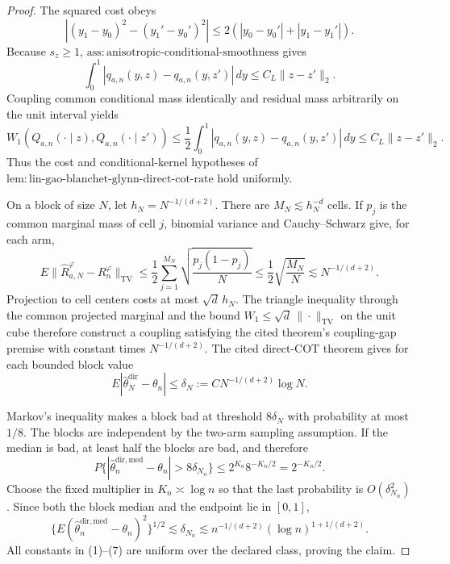 \documentclass{article}
\begin{document}
\begin{proof}
The squared cost obeys
\[
|(y_1-y_0)^2-(y_1'-y_0')^2|
\le2(|y_0-y_0'|+|y_1-y_1'|).                                      \tag{1}
\]
Because \(s_z\ge1\), \(\mathrm{ass{:}anisotropic\text{-}conditional\text{-}smoothness}\) gives
\[
\int_0^1|q_{a,n}(y,z)-q_{a,n}(y,z')|\,dy
\le C_L\|z-z'\|_2.                                                \tag{2}
\]
Coupling common conditional mass identically and residual mass arbitrarily on the unit interval yields
\[
W_1(Q_{a,n}(\cdot\mid z),Q_{a,n}(\cdot\mid z'))
\le\frac12\int_0^1|q_{a,n}(y,z)-q_{a,n}(y,z')|\,dy
\le C_L\|z-z'\|_2.                                                \tag{3}
\]
Thus the cost and conditional-kernel hypotheses of \(\mathrm{lem{:}lin\text{-}gao\text{-}blanchet\text{-}glynn\text{-}direct\text{-}cot\text{-}rate}\) hold uniformly.

On a block of size \(N\), let \(h_N=N^{-1/(d+2)}\). There are \(M_N\lesssim h_N^{-d}\) cells. If \(p_j\) is the common marginal mass of cell \(j\), binomial variance and Cauchy--Schwarz give, for each arm,
\[
E\|\widehat R_{a,N}^{\varphi}-R_n^\varphi\|_{\mathrm{TV}}
\le\frac12\sum_{j=1}^{M_N}\sqrt{\frac{p_j(1-p_j)}N}
\le\frac12\sqrt{\frac{M_N}{N}}
\lesssim N^{-1/(d+2)}.                                             \tag{4}
\]
Projection to cell centers costs at most \(\sqrt d\,h_N\). The triangle inequality through the common projected marginal and the bound \(W_1\le\sqrt d\,\|\cdot\|_{\mathrm{TV}}\) on the unit cube therefore construct a coupling satisfying the cited theorem's coupling-gap premise with constant times \(N^{-1/(d+2)}\). The cited direct-COT theorem gives for each bounded block value
\[
E|\widehat\theta_N^{\mathrm{dir}}-\theta_n|
\le\delta_N:=C N^{-1/(d+2)}\log N.                                \tag{5}
\]

Markov's inequality makes a block bad at threshold \(8\delta_N\) with probability at most \(1/8\). The blocks are independent by the two-arm sampling assumption. If the median is bad, at least half the blocks are bad, and therefore
\[
P\{|\widehat\theta_n^{\mathrm{dir,med}}-\theta_n|>8\delta_{N_n}\}
\le2^{K_n}8^{-K_n/2}=2^{-K_n/2}.                                  \tag{6}
\]
Choose the fixed multiplier in \(K_n\asymp\log n\) so that the last probability is \(O(\delta_{N_n}^2)\). Since both the block median and the endpoint lie in \([0,1]\),
\[
\{E(\widehat\theta_n^{\mathrm{dir,med}}-\theta_n)^2\}^{1/2}
\lesssim\delta_{N_n}
\lesssim n^{-1/(d+2)}(\log n)^{1+1/(d+2)}.                         \tag{7}
\]
All constants in (1)--(7) are uniform over the declared class, proving the claim.
\end{proof}
\end{document}
